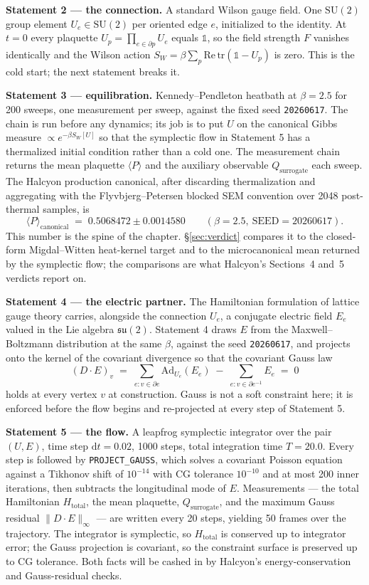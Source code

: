 \documentclass[12pt,a4paper]{article}
\theoremstyle{plain}
\theoremstyle{definition}
\theoremstyle{remark}
\begin{document}
\textbf{Statement 2 --- the connection.} A standard Wilson gauge field. One $\mathrm{SU}(2)$ group element $U_e \in \mathrm{SU}(2)$ per oriented edge $e$, initialized to the identity. At $t = 0$ every plaquette $U_p = \prod_{e \in \partial p} U_e$ equals $\mathbb{1}$, so the field strength $F$ vanishes identically and the Wilson action $S_W = \beta \sum_p \mathrm{Re}\,\mathrm{tr}(\mathbb{1} - U_p)$ is zero. This is the cold start; the next statement breaks it.

\textbf{Statement 3 --- equilibration.} Kennedy--Pendleton heatbath at $\beta = 2.5$ for 200 sweeps, one measurement per sweep, against the fixed seed \texttt{20260617}. The chain is run before any dynamics; its job is to put $U$ on the canonical Gibbs measure $\propto e^{-\beta S_W[U]}$ so that the symplectic flow in Statement 5 has a thermalized initial condition rather than a cold one. The measurement chain returns the mean plaquette $\langle P \rangle$ and the auxiliary observable $Q_{\mathrm{surrogate}}$ each sweep. The Halcyon production canonical, after discarding thermalization and aggregating with the Flyvbjerg--Petersen blocked SEM convention over 2048 post-thermal samples, is
\[
\langle P \rangle_{\mathrm{canonical}} \;=\; 0.5068472 \pm 0.0014580 \qquad (\beta = 2.5,\ \mathrm{SEED} = 20260617).
\]
This number is the spine of the chapter. \S\ref{sec:verdict} compares it to the closed-form Migdal--Witten heat-kernel target and to the microcanonical mean returned by the symplectic flow; the comparisons are what Halcyon's Sections~4 and~5 verdicts report on.

\textbf{Statement 4 --- the electric partner.} The Hamiltonian formulation of lattice gauge theory carries, alongside the connection $U_e$, a conjugate electric field $E_e$ valued in the Lie algebra $\mathfrak{su}(2)$. Statement 4 draws $E$ from the Maxwell--Boltzmann distribution at the same $\beta$, against the seed \texttt{20260617}, and projects onto the kernel of the covariant divergence so that the covariant Gauss law
\[
(D \cdot E)_v \;=\; \sum_{e : v \in \partial e} \mathrm{Ad}_{U_e}(E_e) \;-\; \sum_{e : v \in \partial e^{-1}} E_e \;=\; 0
\]
holds at every vertex $v$ at construction. Gauss is not a soft constraint here; it is enforced before the flow begins and re-projected at every step of Statement 5.

\textbf{Statement 5 --- the flow.} A leapfrog symplectic integrator over the pair $(U, E)$, time step $\mathrm{d}t = 0.02$, 1000 steps, total integration time $T = 20.0$. Every step is followed by \texttt{PROJECT\_GAUSS}, which solves a covariant Poisson equation against a Tikhonov shift of $10^{-14}$ with CG tolerance $10^{-10}$ and at most 200 inner iterations, then subtracts the longitudinal mode of $E$. Measurements --- the total Hamiltonian $H_{\mathrm{total}}$, the mean plaquette, $Q_{\mathrm{surrogate}}$, and the maximum Gauss residual $\|D \cdot E\|_\infty$ --- are written every 20 steps, yielding 50 frames over the trajectory. The integrator is symplectic, so $H_{\mathrm{total}}$ is conserved up to integrator error; the Gauss projection is covariant, so the constraint surface is preserved up to CG tolerance. Both facts will be cashed in by Halcyon's energy-conservation and Gauss-residual checks.
\end{document}
